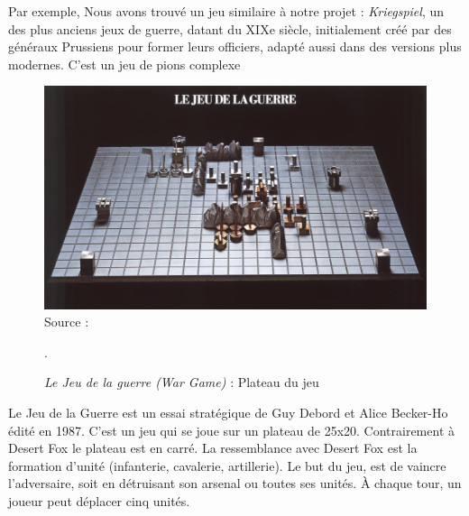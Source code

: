 Par exemple, Nous avons trouvé un jeu similaire à notre projet : \textit{Kriegspiel}, un des plus anciens jeux de guerre, datant du XIXe siècle, initialement créé par des généraux Prussiens pour former leurs officiers, adapté aussi dans des versions plus modernes.
C'est un jeu de pions complexe   \cite{livermore1879american}
\begin{figure}[H]
    \centering
    \includegraphics[scale=1.0]{data/Cavalry_at_dusk.jpg}\\

    Source : 
    \caption{\textit{Le Jeu de la guerre (War Game)} : Plateau du jeu}.

\end{figure}

Le Jeu de la Guerre \cite{frwiki:189457170} est un essai stratégique de Guy Debord et Alice Becker-Ho édité en 1987.
C'est un jeu qui se joue sur un plateau de 25x20. Contrairement à Desert Fox le plateau est en carré. La ressemblance avec Desert Fox est la formation d'unité (infanterie, cavalerie, artillerie).
Le but du jeu, est de vaincre l'adversaire, soit en détruisant son arsenal ou toutes ses unités. À chaque tour, un joueur peut déplacer cinq unités.


